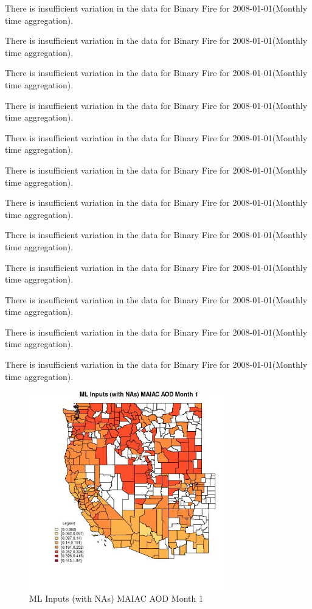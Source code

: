 There is insufficient variation in the data for Binary Fire for 2008-01-01(Monthly time aggregation). 
 

There is insufficient variation in the data for Binary Fire for 2008-01-01(Monthly time aggregation). 
 

There is insufficient variation in the data for Binary Fire for 2008-01-01(Monthly time aggregation). 
 

There is insufficient variation in the data for Binary Fire for 2008-01-01(Monthly time aggregation). 
 

There is insufficient variation in the data for Binary Fire for 2008-01-01(Monthly time aggregation). 
 

There is insufficient variation in the data for Binary Fire for 2008-01-01(Monthly time aggregation). 
 

There is insufficient variation in the data for Binary Fire for 2008-01-01(Monthly time aggregation). 
 

There is insufficient variation in the data for Binary Fire for 2008-01-01(Monthly time aggregation). 
 

There is insufficient variation in the data for Binary Fire for 2008-01-01(Monthly time aggregation). 
 

There is insufficient variation in the data for Binary Fire for 2008-01-01(Monthly time aggregation). 
 

There is insufficient variation in the data for Binary Fire for 2008-01-01(Monthly time aggregation). 
 

There is insufficient variation in the data for Binary Fire for 2008-01-01(Monthly time aggregation). 
 

\begin{figure} 
\centering  
\includegraphics[width=0.77\textwidth]{Code_Outputs/Report_ML_input_PM25_Step4_part_f_de_duplicated_aves_prioritize_24hr_obswNAs_CountyMAIAC_AODmedianMonth1.jpg} 
\caption{\label{fig:Report_ML_input_PM25_Step4_part_f_de_duplicated_aves_prioritize_24hr_obswNAsCountyMAIAC_AODmedianMonth1}ML Inputs (with NAs) MAIAC AOD Month 1} 
\end{figure} 
 

